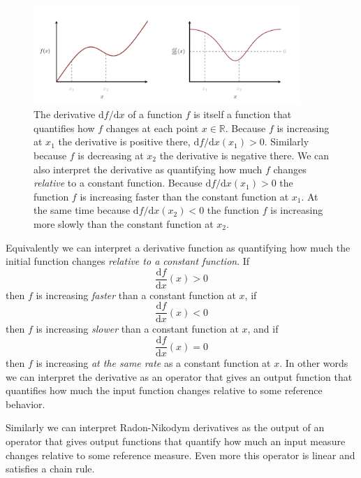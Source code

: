\documentclass[
  letterpaper,
  DIV=11,
  numbers=noendperiod]{scrartcl}
\begin{document}
\begin{figure}

{\centering \includegraphics[width=0.9\textwidth,height=\textheight]{figures/differentiation/differentiation.pdf}

}

\caption{\label{fig-differentiation}The derivative
\(\mathrm{d} f / \mathrm{d} x\) of a function \(f\) is itself a function
that quantifies how \(f\) changes at each point \(x \in \mathbb{R}\).
Because \(f\) is increasing at \(x_{1}\) the derivative is positive
there, \(\mathrm{d} f / \mathrm{d} x (x_{1}) > 0\). Similarly because
\(f\) is decreasing at \(x_{2}\) the derivative is negative there. We
can also interpret the derivative as quantifying how much \(f\) changes
\emph{relative} to a constant function. Because
\(\mathrm{d} f / \mathrm{d} x (x_{1}) > 0\) the function \(f\) is
increasing faster than the constant function at \(x_{1}\). At the same
time because \(\mathrm{d} f / \mathrm{d} x (x_{2}) < 0\) the function
\(f\) is increasing more slowly than the constant function at
\(x_{2}\).}

\end{figure}

Equivalently we can interpret a derivative function as quantifying how
much the initial function changes \emph{relative to a constant
function}. If \[
\frac{ \mathrm{d} f }{ \mathrm{d} x}(x) > 0
\] then \(f\) is increasing \emph{faster} than a constant function at
\(x\), if \[
\frac{ \mathrm{d} f }{ \mathrm{d} x}(x) < 0
\] then \(f\) is increasing \emph{slower} than a constant function at
\(x\), and if \[
\frac{ \mathrm{d} f }{ \mathrm{d} x}(x) = 0
\] then \(f\) is increasing \emph{at the same rate} as a constant
function at \(x\). In other words we can interpret the derivative as an
operator that gives an output function that quantifies how much the
input function changes relative to some reference behavior.

Similarly we can interpret Radon-Nikodym derivatives as the output of an
operator that gives output functions that quantify how much an input
measure changes relative to some reference measure. Even more this
operator is linear and satisfies a chain rule.
\end{document}
